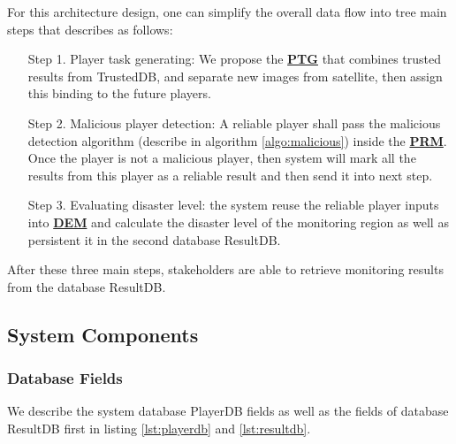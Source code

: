 For this architecture design, one can simplify the overall data flow into tree main steps 
that describes as follows:

\begin{itemize}

\item [Step 1.]  Player task generating: 
We propose the \textbf{\hyperref[idx:ptg]{PTG}}
that combines trusted results from TrustedDB, 
and separate new images from satellite, then assign this binding to the future players.

\item [Step 2.] Malicious player detection: 
A reliable player shall pass the malicious detection algorithm (describe in algorithm \ref{algo:malicious})
inside the \textbf{\hyperref[idx:prm]{PRM}}. 
Once the player is not a malicious player, then system will mark all the results from this player
as a reliable result and then send it into next step.

\item [Step 3.] Evaluating disaster level:  the system reuse the reliable player inputs 
into \textbf{\hyperref[idx:dem]{DEM}} and calculate the disaster level of the monitoring region
 as well as persistent it in the second database ResultDB.

\end{itemize}

After these three main steps, stakeholders are able to retrieve monitoring results from
the database ResultDB. 

\subsection{System Components}

\subsubsection{Database Fields}

We describe the system database PlayerDB 
fields as well as the fields of database ResultDB first in listing \ref{lst:playerdb}
and \ref{lst:resultdb}.

